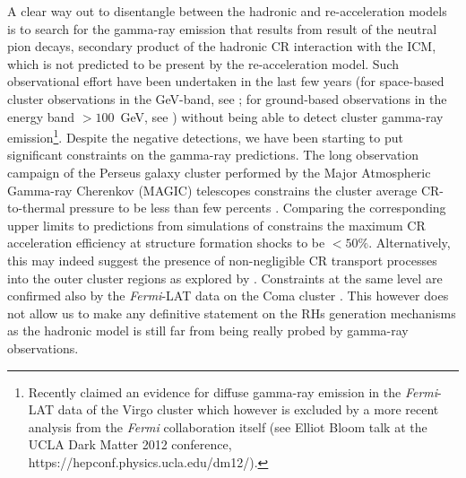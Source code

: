 \documentclass[traditabstract]{aa}
\begin{document}
A clear way out to disentangle between the hadronic and re-acceleration models is to search for the gamma-ray emission that results from
result of the neutral pion decays, secondary product of the hadronic CR interaction with the ICM, which is not predicted to be present
by the re-acceleration model. Such observational effort have been undertaken in the last few years (for space-based cluster observations in the GeV-band, 
see \citealt{2003ApJ...588..155R, 2010ApJ...717L..71A, 2010JCAP...05..025A,2012AAS...21920701Z,2012arXiv1201.1003H}; for ground-based 
observations in the energy band $>100$~GeV, see \citealt{2006ApJ...644..148P, 2008AIPC.1085..569P, 2009A&A...495...27A,2009arXiv0907.0727T, 
2009arXiv0907.3001D, 2009arXiv0907.5000G,cangaroo_clusters,2009ApJ...706L.275A,2010ApJ...710..634A,2011arXiv1111.5544M}) without being able to detect
cluster gamma-ray emission\footnote[1]{Recently \cite{2012arXiv1201.1003H} claimed an evidence for diffuse gamma-ray emission in the \emph{Fermi}-LAT data of 
the Virgo cluster which however is excluded by a more recent analysis from the \emph{Fermi} collaboration itself (see Elliot Bloom talk at the UCLA Dark Matter 2012 conference, https://hepconf.physics.ucla.edu/dm12/).}.
Despite the negative detections, we have been starting to put significant constraints on the gamma-ray predictions. The long observation campaign of the Perseus 
galaxy cluster performed by the Major Atmospheric Gamma-ray Cherenkov (MAGIC) telescopes constrains the cluster average CR-to-thermal pressure to 
be less than few percents \citep{2010ApJ...710..634A,2011arXiv1111.5544M}. Comparing the corresponding upper limits to predictions from 
simulations of \cite{2010MNRAS.409..449P} constrains the maximum CR acceleration efficiency at structure formation shocks to be $<50\%$. 
Alternatively, this may indeed suggest the presence of non-negligible CR transport processes into the outer cluster regions as explored by \cite{2011A&A...527A..99E}. 
Constraints at the same level are confirmed also by the \emph{Fermi}-LAT data on the Coma cluster \citep{2012AAS...21920701Z,2012arXiv1201.1003H}. 
This however does not allow us to make any definitive statement on the RHs generation mechanisms as the hadronic model is still far from being really 
probed by gamma-ray observations.
\end{document}
